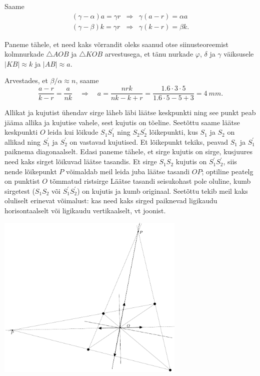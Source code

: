\documentclass[10pt]{article}
\begin{document}
{Saame
\[
\begin{array}{lll}{(\gamma-\alpha) a=\gamma r} & {\Rightarrow} & {\gamma(a-r)=\alpha a} \\ {(\gamma-\beta) k=\gamma r} & {\Rightarrow} & {\gamma(k-r)=\beta k.}\end{array}
\]

Paneme tähele, et need kaks võrrandit oleks saanud otse siinusteoreemist kolmnurkade $\triangle AOB$ ja $\triangle KOB$ arvestusega, et tänu nurkade $\varphi$, $\delta$ ja $\gamma$ väiksusele $|KB| \approx k$ ja $|AB| \approx a$.

Arvestades, et $\beta /\alpha \approx n$, saame
\[
\frac{a-r}{k-r}=\frac{a}{n k} \quad \Rightarrow \quad a=\frac{n r k}{n k-k+r}=\frac{\num{1,6} \cdot \num{3} \cdot \num{5}}{\num{1,6} \cdot \num{5}-\num{5}+\num{3}}=\SI{4}{mm}.
\]
\probend
\bigskip


\solu
Allikat ja kujutist ühendav sirge läheb läbi läätse keskpunkti ning see punkt peab jääma allika ja kujutise vahele, sest kujutis on tõeline.
Seetõttu saame läätse keskpunkti $O$ leida kui lõikude $S_1S_1^\prime$ ning $S_2S_2^\prime$ lõikepunkti, kus $S_1$ ja $S_2$ on allikad ning $S_1^\prime$ ja $S_2^\prime$
on vastavad kujutised. Et lõikepunkt tekiks, peavad $S_1$ ja $S_1^\prime$ paiknema diagonaalselt. Edasi paneme tähele, et sirge kujutis on sirge, kusjuures
need kaks sirget lõikuvad läätse tasandis. Et sirge $S_1S_2$ kujutis on $S_1^\prime S_2^\prime$, siis nende lõikepunkt $P$ võimaldab meil leida juba
läätse tasandi $OP$; optiline peatelg on punktist $O$ tõmmatud ristsirge Läätse tasandi seisukohast pole oluline, kumb sirgetest ($S_1S_2$ või $S_1^\prime S_2^\prime$) on kujutis ja kumb originaal.
Seetõttu tekib meil kaks oluliselt erinevat võimalust: kas need kaks sirged paiknevad ligikaudu horisontaalselt või ligikaudu vertikaalselt, vt joonist.\\

\begin{center}
	\includegraphics[width=90mm]{2010-v3g-09-punktid_lah}
\end{center}
\probend
\bigskip

}
\end{document}
